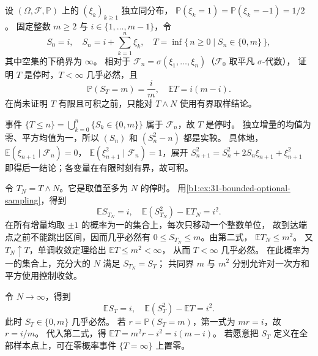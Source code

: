 \begin{optionalexercise}\label{b1:ex:31-gamblers-ruin}
设 \((\Omega,\mathcal F,\mathbb P)\) 上的 \((\xi_k)_{k\geq1}\) 独立同分布，
\(\mathbb P(\xi_k=1)=\mathbb P(\xi_k=-1)=1/2\)。
固定整数 \(m\geq2\) 与 \(i\in\{1,\ldots,m-1\}\)，令
\[
 S_0=i,\quad S_n=i+\sum_{k=1}^n\xi_k,\quad
 T=\inf\{\,n\geq0\mid S_n\in\{0,m\}\,\},
\]
其中空集的下确界为 \(\infty\)。
相对于 \(\mathcal F_n=\sigma(\xi_1,\ldots,\xi_n)\)（\(\mathcal F_0\) 取平凡 \(\sigma\)-代数），
证明 \(T\) 是停时，\(T<\infty\) 几乎必然，且
\[
 \mathbb P(S_T=m)=\frac im,\quad \mathbb ET=i(m-i).
\]
在尚未证明 \(T\) 有限且可积之前，只能对 \(T\wedge N\) 使用有界取样结论。
\end{optionalexercise}
\begin{solution}
事件 \(\{T\leq n\}=\bigcup_{k=0}^n\{S_k\in\{0,m\}\}\) 属于 \(\mathcal F_n\)，故 \(T\) 是停时。
独立增量的均值为零、平方均值为一，所以 \((S_n)\) 和 \((S_n^2-n)\) 都是实鞅。
具体地，\(\mathbb E(\xi_{n+1}\mid\mathcal F_n)=0\)，
\(\mathbb E(\xi_{n+1}^2\mid\mathcal F_n)=1\)，展开
\(S_{n+1}^2=S_n^2+2S_n\xi_{n+1}+\xi_{n+1}^2\) 即得后一结论；各变量在有限时刻有界，故可积。

令 \(T_N=T\wedge N\)。它是取值至多为 \(N\) 的停时。
用\cref{b1:ex:31-bounded-optional-sampling}，得到
\[
 \mathbb ES_{T_N}=i,\quad
 \mathbb E(S_{T_N}^2)-\mathbb ET_N=i^2.
\]
在所有增量均取 \(\pm1\) 的概率为一的集合上，每次只移动一个整数单位，
故到达端点之前不能跳出区间，因而几乎必然有
\(0\leq S_{T_N}\leq m\)。由第二式，
\(\mathbb ET_N\leq m^2\)。
又 \(T_N\uparrow T\)，单调收敛定理给出 \(\mathbb ET\leq m^2<\infty\)，
从而 \(T<\infty\) 几乎必然。
在此概率为一的集合上，充分大的 \(N\) 满足 \(S_{T_N}=S_T\)；
共同界 \(m\) 与 \(m^2\) 分别允许对一次方和平方使用控制收敛。

令 \(N\to\infty\)，得到
\[
 \mathbb ES_T=i,\quad \mathbb E(S_T^2)-\mathbb ET=i^2.
\]
此时 \(S_T\in\{0,m\}\) 几乎必然。
若 \(r=\mathbb P(S_T=m)\)，第一式为 \(mr=i\)，故 \(r=i/m\)。
代入第二式，得 \(\mathbb ET=m^2r-i^2=i(m-i)\)。
若愿意把 \(S_T\) 定义在全部样本点上，可在零概率事件 \(\{T=\infty\}\) 上置零。
\end{solution}

